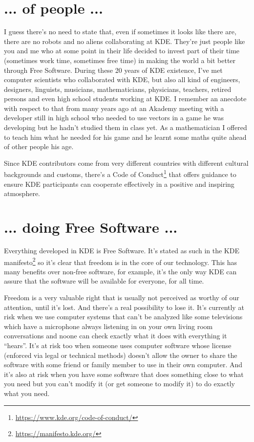 \section*{... of people ...}
I guess there's no need to state that, even if sometimes it looks like there are, there are no robots and no aliens collaborating at KDE. They're just people like you and me who at some point in their life decided to invest part of their time (sometimes work time, sometimes free time) in making the world a bit better through Free Software. During these 20 years of KDE existence, I've met computer scientists who collaborated with KDE, but also all kind of engineers, designers, linguists, musicians, mathematicians, physicians, teachers, retired persons and even high school students working at KDE. I remember an anecdote with respect to that from many years ago at an Akademy meeting with a developer still in high school who needed to use vectors in a game he was developing but he hadn't studied them in class yet. As a mathematician I offered to teach him what he needed for his game and he learnt some maths quite ahead of other people his age.

Since KDE contributors come from very different countries with different cultural backgrounds and customs, there's a Code of Conduct\footnote{\url{https://www.kde.org/code-of-conduct/}} that offers guidance to ensure KDE participants can cooperate effectively in a positive and inspiring atmosphere.

\section*{... doing Free Software ...}
Everything developed in KDE is Free Software. It's stated as such in the KDE manifesto\footnote{\url{https://manifesto.kde.org/}} so it's clear that freedom is in the core of our technology. This has many benefits over non-free software, for example, it's the only way KDE can assure that the software will be available for everyone, for all time.

Freedom is a very valuable right that is usually not perceived as worthy of our attention, until it's lost. And there's a real possibility to lose it. It's currently at risk when we use computer systems that can't be analyzed like some televisions which have a microphone always listening in on your own living room conversations and noone can check exactly what it does with everything it “hears”. It's at risk too when someone uses computer software whose license (enforced via legal or technical methods) doesn't allow the owner to share the software with some friend or family member to use in their own computer. And it's also at risk when you have some software that does something close to what you need but you can't modify it (or get someone to modify it) to do exactly what you need.

